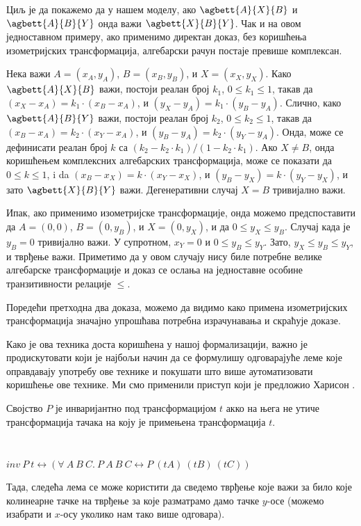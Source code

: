 Циљ је да покажемо да у нашем моделу, ако $\agbett{A}{X}{B}$ и
$\agbett{A}{B}{Y}$ онда важи $\agbett{X}{B}{Y}$. Чак и на овом
једноставном примеру, ако применимо директан доказ, без коришћења
изометријских трансформација, алгебарски рачун постаје превише
комплексан.

Нека важи $A=(x_A, y_A)$, $B=(x_B, y_B)$, и $X=(x_X, y_X)$.  Како
$\agbett{A}{X}{B}$ важи, постоји реалан број $k_1$, $0 \le k_1 \le 1$,
такав да $(x_X - x_A) = k_1 \cdot (x_B - x_A)$, и $(y_X - y_A) = k_1
\cdot (y_B - y_A)$. Слично, како $\agbett{A}{B}{Y}$ важи, постоји
реалан број $k_2$, $0 \le k_2 \le 1$, такав да $(x_B - x_A) = k_2
\cdot (x_Y - x_A)$, и $(y_B - y_A) = k_2 \cdot (y_Y - y_A)$. Онда,
може се дефинисати реалан број $k$ са $(k_2 - k_2\cdot k_1) /
(1-k_2\cdot k_1).$ Ако $X\neq B$, онда коришћењем комплексних
алгебарских трансформација, може се показати да $0 \le k \le 1$, i da
$(x_B - x_X) = k \cdot (x_Y - x_X)$, и $(y_B - y_X) = k \cdot (y_Y -
y_X)$, и зато $\agbett{X}{B}{Y}$ важи. Дегенеративни случај $X=B$
тривијално важи.

Ипак, ако применимо изометријске трансформације, онда можемо
предспоставити да $A=(0, 0)$, $B=(0, y_B)$, и $X=(0, y_X)$, и да $0
\le y_X \le y_B$. Случај када је $y_B = 0$ тривијално важи. У
супротном, $x_Y = 0$ и $0 \le y_B \le y_Y$. Зато, $y_X \le y_B \le
y_Y$, и тврђење важи. Приметимо да у овом случају нису биле потребне
велике алгебарске трансформације и доказ се ослања на једноставне
особине транзитивности релације $\le$.

Поредећи претходна два доказа, можемо да видимо како примена
изометријских трансформација значајно упрошћава потребна израчунавања
и скраћује доказе.

Како је ова техника доста коришћена у нашој формализацији, важно је
продискутовати који је најбољи начин да се формулишу одговарајуће леме
које оправдавају употребу ове технике и покушати што више
аутоматизовати коришћење ове технике. Ми смо применили приступ који је
предложио Харисон \cite{wlog}.

Својство $P$ је инваријантно под трансформацијом $t$ акко на њега не 
утиче трансформација тачака на коју је примењена трансформација $t$.

{\tt
\begin{tabbing}
$inv\ P\ t \longleftrightarrow (\forall\ A\ B\ C.\ P\ A\ B\ C
\longleftrightarrow P\ (t A)\ (t B)\ (t C))$
\end{tabbing}
}

Тада, следећа лема се може користити да сведемо тврђење које важи за
било које колинеарне тачке на тврђење за које разматрамо дамо тачке
$y$-осе (можемо изабрати и $x$-осу уколико нам тако више одговара).

